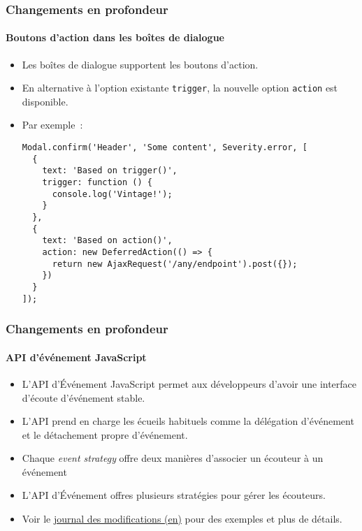 
\begin{frame}[fragile]
	\frametitle{Changements en profondeur}
	\framesubtitle{Boutons d'action dans les boîtes de dialogue}

	\lstset{basicstyle=\tiny\ttfamily}

	\begin{itemize}
		\item Les boîtes de dialogue supportent les boutons d'action.
		\item En alternative à l'option existante \texttt{trigger}, la nouvelle
			option \texttt{action} est disponible.
		\item Par exemple~:
\begin{lstlisting}
Modal.confirm('Header', 'Some content', Severity.error, [
  {
    text: 'Based on trigger()',
    trigger: function () {
      console.log('Vintage!');
    }
  },
  {
    text: 'Based on action()',
    action: new DeferredAction(() => {
      return new AjaxRequest('/any/endpoint').post({});
    })
  }
]);
\end{lstlisting}

	\end{itemize}

\end{frame}


\begin{frame}[fragile]
	\frametitle{Changements en profondeur}
	\framesubtitle{API d'événement JavaScript}

	\begin{itemize}
		\item L'API d'Événement JavaScript permet aux développeurs d'avoir une
			interface d'écoute d'événement stable.
		\item L'API prend en charge les écueils habituels comme la délégation
			d'événement et le détachement propre d'événement.
		\item Chaque \textit{event strategy} offre deux manières d'associer un
			écouteur à un événement
		\item L'API d'Événement offres plusieurs stratégies pour gérer les écouteurs.
		\item Voir le
			\href{https://docs.typo3.org/c/typo3/cms-core/master/en-us/Changelog/10.3/Feature-90471-JavaScriptEventAPI.html}{journal des modifications (en)}
			pour des exemples et plus de détails.
	\end{itemize}

\end{frame}

